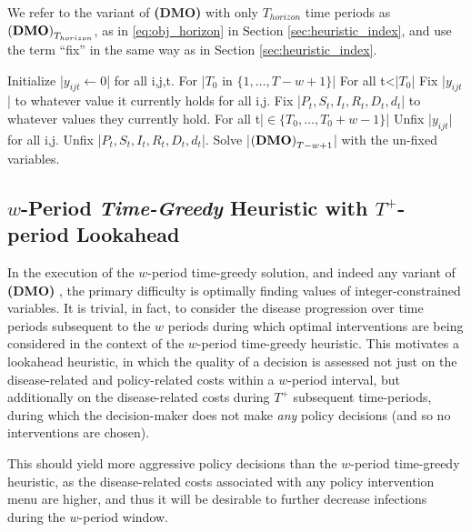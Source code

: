 \documentclass{article}
\newcommand{\model}{{\bf (DMO) }}
\begin{document}
We refer to the variant of \model with only $T_{horizon}$ time periods as ${\model}_{T_{horizon}}$, as in \eqref{eq:obj_horizon} in Section \ref{sec:heuristic_index}, and use the term ``fix'' in the same way as in Section \ref{sec:heuristic_index}.

\begin{pseudocode}
    Initialize |$y_{ijt}\leftarrow0$| for all i,j,t.
    For |$T_0$ in $\{1,\ldots,T-w+1\}$|
        For all t<|$T_0$|
            Fix |$y_{ijt}$| to whatever value it currently holds for all i,j.
            Fix |$P_t,S_t,I_t,R_t,D_t,d_t$| to whatever values they currently hold.
        For all t|$\in\{T_0,\ldots,T_0+w-1\}$|
            Unfix |$y_{ijt}$| for all i,j. Unfix |$P_t,S_t,I_t,R_t,D_t,d_t$|.
        Solve |${\model}_{T-w+1}$| with the un-fixed variables.
\end{pseudocode}


\subsection{$w$-Period \emph{Time-Greedy} Heuristic with $T^+$-period Lookahead}
    In the execution of the $w$-period time-greedy solution, and indeed any variant of \model, the primary difficulty is optimally finding values of integer-constrained variables. It is trivial, in fact, to consider the disease progression over time periods subsequent to the $w$ periods during which optimal interventions are being considered in the context of the $w$-period time-greedy heuristic. This motivates a lookahead heuristic, in which the quality of a decision is assessed not just on the disease-related and policy-related costs within a $w$-period interval, but additionally on the disease-related costs during $T^+$ subsequent time-periods, during which the decision-maker does not make \emph{any} policy decisions (and so no interventions are chosen).

    This should yield more aggressive policy decisions than the $w$-period time-greedy heuristic, as the disease-related costs associated with any policy intervention menu are higher, and thus it will be desirable to further decrease infections during the $w$-period window.
\end{document}
